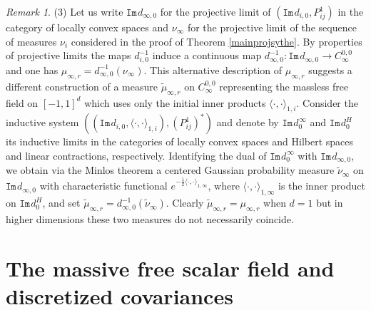 \documentclass[11pt,reqno]{amsart}
\numberwithin{equation}{section}
\theoremstyle{remark}
\newtheorem{remark}[theorem]{Remark}
\theoremstyle{rmdefinition}
\begin{document}
\begin{remark}
(3) Let us write $\mathtt{Im}\hspace{1pt}d_{\infty,0}$  for the projective limit of $(\mathtt{Im}\hspace{1pt}d_{i,0},P^1_{ij})$ in the category of locally convex spaces and $\nu_{\infty}$ for the projective limit of the sequence of measures $\nu_i$ considered in the proof of Theorem \ref{mainprojsythe}. By properties of projective limits the maps $d_{i,0}^{-1}$  induce a continuous map $d_{\infty,0}^{-1}: \mathtt{Im}\hspace{1pt}d_{\infty,0} \to C^{0,0}_{\infty}$ and one has $\mu_{\infty,r}=d_{\infty,0}^{-1}(\nu_{\infty})$. This alternative description of $\mu_{\infty,r}$ suggests a different construction of a measure $\tilde{\mu}_{\infty,r}$ on $C^{0,0}_{\infty}$ representing the massless free field on $[-1,1]^d$ which uses only the initial inner products $\langle \cdot, \cdot \rangle_{1,i}$. Consider the inductive system $((\mathtt{Im}\hspace{1pt}d_{i,0},\langle \cdot, \cdot \rangle_{1,i}),(P^1_{ij})^{*})$ and denote by $\mathtt{Im}\hspace{1pt}d^{\hspace{1pt}\infty}_{0}$ and $\mathtt{Im}\hspace{1pt}d^{H}_{0}$ its inductive limits in the categories of locally convex spaces and Hilbert spaces and linear contractions, respectively. Identifying the dual of $\mathtt{Im}\hspace{1pt}d^{\hspace{1pt}\infty}_{0}$ with $\mathtt{Im}\hspace{1pt}d_{\infty,0}$, we obtain via the Minlos theorem a centered Gaussian probability measure $\tilde{\nu}_{\infty}$ on $\mathtt{Im}\hspace{1pt}d_{\infty,0}$ with characteristic functional $e^{-\frac{1}{2}\langle \cdot , \cdot \rangle_{1,\infty}}$, where $\langle \cdot , \cdot \rangle_{1,\infty}$ is the inner product on $\mathtt{Im}\hspace{1pt}d^{H}_{0}$, and set $\tilde{\mu}_{\infty,r}=d_{\infty,0}^{-1}(\tilde{\nu}_{\infty})$. Clearly $\tilde{\mu}_{\infty,r}=\mu_{\infty,r}$ when $d=1$ but in higher dimensions these two measures do not necessarily coincide.
\end{remark}

\section{The massive free scalar field and discretized covariances}\label{rimmandsec}
\end{document}
